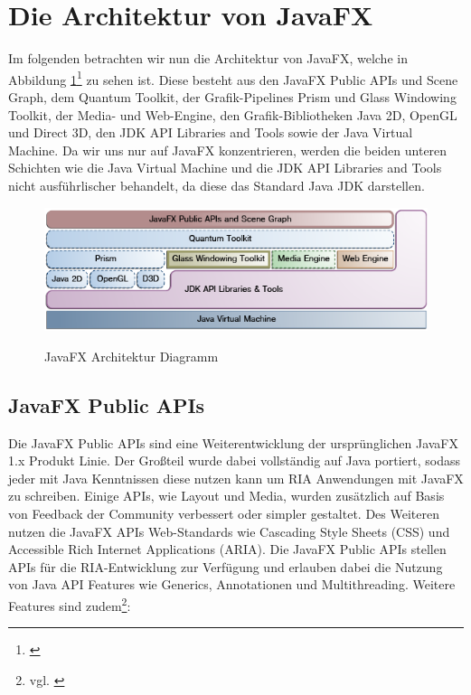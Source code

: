 \section{Die Architektur von JavaFX}

Im folgenden betrachten wir nun die Architektur von JavaFX, welche in Abbildung \ref{fig:jfx_architecture}\footnote{\cite{javafxarchitecture}} zu sehen ist. Diese besteht aus den JavaFX Public APIs und Scene Graph, dem Quantum Toolkit, der Grafik-Pipelines Prism und Glass Windowing Toolkit, der Media- und Web-Engine, den Grafik-Bibliotheken Java 2D, OpenGL und Direct 3D, den JDK API Libraries and Tools sowie der Java Virtual Machine. Da wir uns nur auf JavaFX konzentrieren, werden die beiden unteren Schichten wie die Java Virtual Machine und die JDK API Libraries and Tools nicht ausführlischer behandelt, da diese das Standard Java JDK darstellen.

\begin{figure}[!ht]
  \centering
    \includegraphics[width=1.0\textwidth,keepaspectratio]{images/jfx_architecture.png}\\
  \caption{JavaFX Architektur Diagramm}
  \label{fig:jfx_architecture}
\end{figure}


\subsection{JavaFX Public APIs}

Die JavaFX Public APIs sind eine Weiterentwicklung der ursprünglichen JavaFX 1.x Produkt Linie. Der Großteil wurde dabei vollständig auf Java portiert, sodass jeder mit Java Kenntnissen diese nutzen kann um RIA Anwendungen mit JavaFX zu schreiben. Einige APIs, wie Layout und Media, wurden zusätzlich auf Basis von Feedback der Community verbessert oder simpler gestaltet. Des Weiteren nutzen die JavaFX APIs Web-Standards wie Cascading Style Sheets (CSS) und Accessible Rich Internet Applications (ARIA). Die JavaFX Public APIs stellen APIs für die RIA-Entwicklung zur Verfügung und erlauben dabei die Nutzung von Java API Features wie Generics, Annotationen und Multithreading. Weitere Features sind zudem\footnote{vgl. \cite{javafxarchitecture}}:


